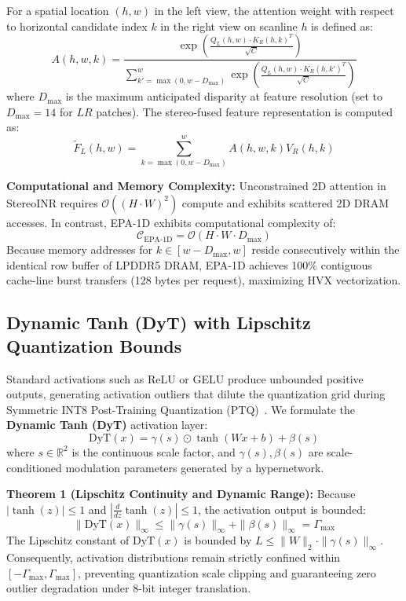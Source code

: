 \documentclass[conference]{IEEEtran}
\begin{document}
For a spatial location $(h, w)$ in the left view, the attention weight with respect to horizontal candidate index $k$ in the right view on scanline $h$ is defined as:
\begin{equation}
    A(h, w, k) = \frac{\exp\left( \frac{Q_L(h, w) \cdot K_R(h, k)^T}{\sqrt{C}} \right)}{\sum_{k' = \max(0, w - D_{\max})}^{w} \exp\left( \frac{Q_L(h, w) \cdot K_R(h, k')^T}{\sqrt{C}} \right)}
    \label{eq:epa_attention}
\end{equation}
where $D_{\max}$ is the maximum anticipated disparity at feature resolution (set to $D_{\max} = 14$ for $LR$ patches). The stereo-fused feature representation is computed as:
\begin{equation}
    \tilde{F}_L(h, w) = \sum_{k = \max(0, w - D_{\max})}^{w} A(h, w, k) V_R(h, k)
    \label{eq:epa_fusion}
\end{equation}

\noindent\textbf{Computational and Memory Complexity:} Unconstrained 2D attention in StereoINR requires $\mathcal{O}((H \cdot W)^2)$ compute and exhibits scattered 2D DRAM accesses. In contrast, EPA-1D exhibits computational complexity of:
\begin{equation}
    \mathcal{C}_{\text{EPA-1D}} = \mathcal{O}(H \cdot W \cdot D_{\max})
\end{equation}
Because memory addresses for $k \in [w - D_{\max}, w]$ reside consecutively within the identical row buffer of LPDDR5 DRAM, EPA-1D achieves 100\% contiguous cache-line burst transfers (128 bytes per request), maximizing HVX vectorization.

\subsection{Dynamic Tanh (DyT) with Lipschitz Quantization Bounds}
Standard activations such as ReLU or GELU produce unbounded positive outputs, generating activation outliers that dilute the quantization grid during Symmetric INT8 Post-Training Quantization (PTQ)~\cite{jacob2018quantization}. We formulate the \textbf{Dynamic Tanh (DyT)} activation layer:
\begin{equation}
    \text{DyT}(x) = \gamma(s) \odot \tanh(W x + b) + \beta(s)
    \label{eq:dyt}
\end{equation}
where $s \in \mathbb{R}^2$ is the continuous scale factor, and $\gamma(s), \beta(s)$ are scale-conditioned modulation parameters generated by a hypernetwork. 

\noindent\textbf{Theorem 1 (Lipschitz Continuity and Dynamic Range):} 
Because $|\tanh(z)| \le 1$ and $|\frac{d}{dz}\tanh(z)| \le 1$, the activation output is bounded:
\begin{equation}
    \|\text{DyT}(x)\|_\infty \le \|\gamma(s)\|_\infty + \|\beta(s)\|_\infty = \Gamma_{\max}
\end{equation}
The Lipschitz constant of $\text{DyT}(x)$ is bounded by $L \le \|W\|_2 \cdot \|\gamma(s)\|_\infty$. Consequently, activation distributions remain strictly confined within $[-\Gamma_{\max}, \Gamma_{\max}]$, preventing quantization scale clipping and guaranteeing zero outlier degradation under 8-bit integer translation.
\end{document}
